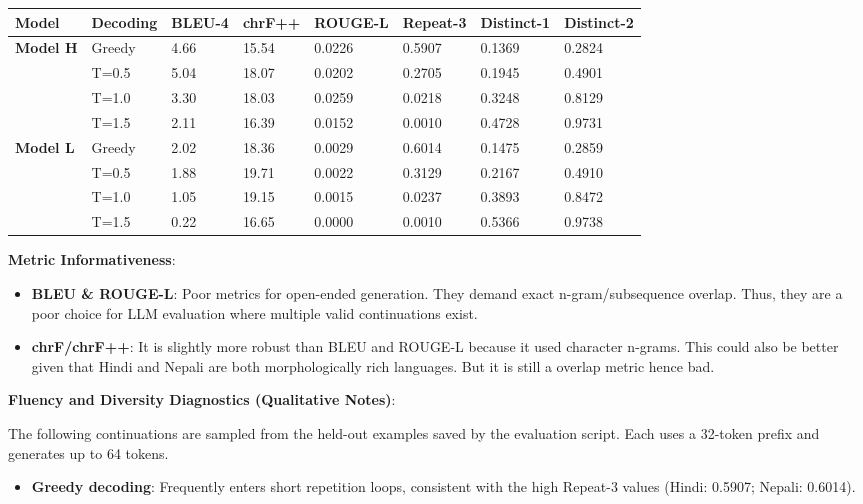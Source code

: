 \documentclass[10pt,a4paper]{article}
\begin{document}
\begin{center}
\small
\begin{longtable}{l l l l l l l l}
\toprule
Model & Decoding & BLEU-4 & chrF++ & ROUGE-L & Repeat-3 & Distinct-1 & Distinct-2 \\
\midrule
\endhead
\textbf{Model H} & Greedy & 4.66 & 15.54 & 0.0226 & 0.5907 & 0.1369 & 0.2824 \\
 & T=0.5 & 5.04 & 18.07 & 0.0202 & 0.2705 & 0.1945 & 0.4901 \\
 & T=1.0 & 3.30 & 18.03 & 0.0259 & 0.0218 & 0.3248 & 0.8129 \\
 & T=1.5 & 2.11 & 16.39 & 0.0152 & 0.0010 & 0.4728 & 0.9731 \\
\textbf{Model L} & Greedy & 2.02 & 18.36 & 0.0029 & 0.6014 & 0.1475 & 0.2859 \\
 & T=0.5 & 1.88 & 19.71 & 0.0022 & 0.3129 & 0.2167 & 0.4910 \\
 & T=1.0 & 1.05 & 19.15 & 0.0015 & 0.0237 & 0.3893 & 0.8472 \\
 & T=1.5 & 0.22 & 16.65 & 0.0000 & 0.0010 & 0.5366 & 0.9738 \\
\bottomrule
\end{longtable}
\end{center}

\textbf{Metric Informativeness}:
\begin{itemize}
\item \textbf{BLEU \& ROUGE-L}: Poor metrics for open-ended generation. They demand exact n-gram/subsequence overlap. Thus, they are a poor choice for LLM evaluation where multiple valid continuations exist.
\item \textbf{chrF/chrF++}: It is slightly more robust than BLEU and ROUGE-L because it used character n-grams. This could also be better given that Hindi and Nepali are both morphologically rich languages. But it is still a overlap metric hence bad.
\end{itemize}

\textbf{Fluency and Diversity Diagnostics (Qualitative Notes)}:

The following continuations are sampled from the held-out examples saved by the evaluation script. Each uses a 32-token prefix and generates up to 64 tokens.

\begin{itemize}
\item \textbf{Greedy decoding}: Frequently enters short repetition loops, consistent with the high Repeat-3 values (Hindi: 0.5907; Nepali: 0.6014).
\end{itemize}
\end{document}
